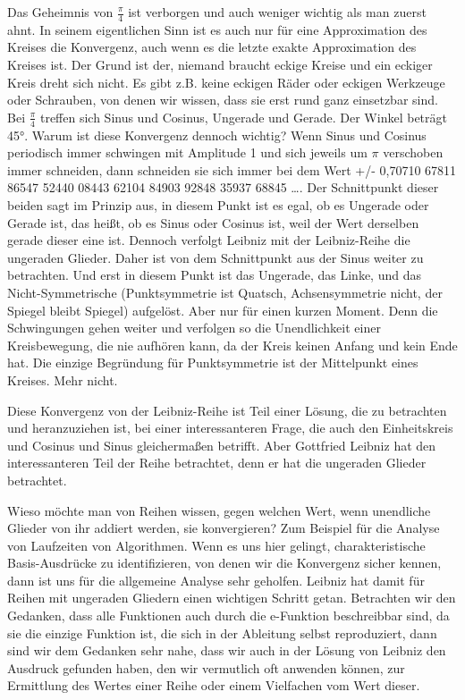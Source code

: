 \documentclass[a4paper, 12pt, twoside, openright]{report}
\theoremstyle{definition}
\theoremstyle{definition}
\begin{document}
Das Geheimnis von $\frac{\pi}{4}$ ist verborgen und auch weniger wichtig als man zuerst ahnt. In seinem eigentlichen Sinn ist es auch nur für eine Approximation des Kreises die Konvergenz, auch wenn es die letzte exakte Approximation des Kreises ist. Der Grund ist der, niemand braucht eckige Kreise und ein eckiger Kreis dreht sich nicht. Es gibt z.B. keine eckigen Räder oder eckigen Werkzeuge oder Schrauben, von denen wir wissen, dass sie erst rund ganz einsetzbar sind. Bei $\frac{\pi}{4}$ treffen sich Sinus und Cosinus, Ungerade und Gerade. Der Winkel beträgt 45°. Warum ist diese Konvergenz dennoch wichtig? Wenn Sinus und Cosinus periodisch immer schwingen mit Amplitude 1 und sich jeweils um $\pi$ verschoben immer schneiden, dann schneiden sie sich immer bei dem Wert +/- 0,70710 67811 86547 52440 08443 62104 84903 92848 35937 68845 \ldots . Der Schnittpunkt dieser beiden sagt im Prinzip aus, in diesem Punkt ist es egal, ob es Ungerade oder Gerade ist, das heißt, ob es Sinus oder Cosinus ist, weil der Wert derselben gerade dieser eine ist. Dennoch verfolgt Leibniz mit der Leibniz-Reihe die ungeraden Glieder. Daher ist von dem Schnittpunkt aus der Sinus weiter zu betrachten. Und erst in diesem Punkt ist das Ungerade, das Linke, und das Nicht-Symmetrische (Punktsymmetrie ist Quatsch, Achsensymmetrie nicht, der Spiegel bleibt Spiegel) aufgelöst. Aber nur für einen kurzen Moment. Denn die Schwingungen gehen weiter und verfolgen so die Unendlichkeit einer Kreisbewegung, die nie aufhören kann, da der Kreis keinen Anfang und kein Ende hat. Die einzige Begründung für Punktsymmetrie ist der Mittelpunkt eines Kreises. Mehr nicht.

Diese Konvergenz von der Leibniz-Reihe ist Teil einer Lösung, die zu betrachten und heranzuziehen ist, bei einer interessanteren Frage, die auch den Einheitskreis und Cosinus und Sinus gleichermaßen betrifft. Aber Gottfried Leibniz hat den interessanteren Teil der Reihe betrachtet, denn er hat die ungeraden Glieder betrachtet.

Wieso möchte man von Reihen wissen, gegen welchen Wert, wenn unendliche Glieder von ihr addiert werden, sie konvergieren? Zum Beispiel für die Analyse von Laufzeiten von Algorithmen. Wenn es uns hier gelingt, charakteristische Basis-Ausdrücke zu identifizieren, von denen wir die Konvergenz sicher kennen, dann ist uns für die allgemeine Analyse sehr geholfen. Leibniz hat damit für Reihen mit ungeraden Gliedern einen wichtigen Schritt getan. Betrachten wir den Gedanken, dass alle Funktionen auch durch die e-Funktion beschreibbar sind, da sie die einzige Funktion ist, die sich in der Ableitung selbst reproduziert, dann sind wir dem Gedanken sehr nahe, dass wir auch in der Lösung von Leibniz den Ausdruck gefunden haben, den wir vermutlich oft anwenden können, zur Ermittlung des Wertes einer Reihe oder einem Vielfachen vom Wert dieser.
\end{document}
